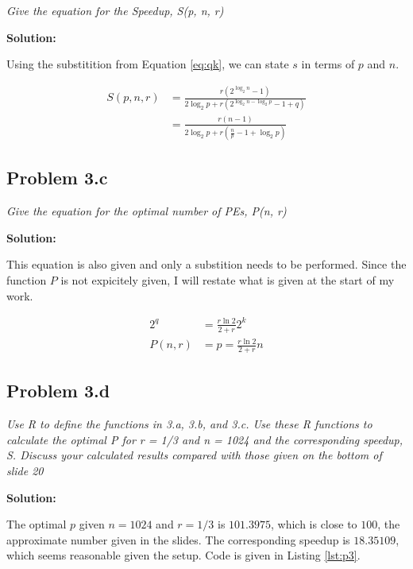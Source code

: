 \documentclass[12pt,letterpaper]{article}
\newcommand{\problem}[1]{\textit{#1} \medskip}
\newcommand{\solution}{ \noindent \textbf{Solution:} \medskip}
\begin{document}
\problem{Give the equation for the Speedup, S(p, n, r)}

\solution

Using the substitition from Equation \ref{eq:qk}, we can state $s$ in terms of $p$ and $n$.

\begin{align}
    S(p, n, r) &= \frac{r\left(2^{\log_2{n}}-1\right)}{2 \log_2{p} +
    r\left(2^{\log_2{n}-\log_2{p}}-1+q\right)}\nonumber\\
    &= \frac{r\left(n-1\right)}{2\log_2{p}+r\left(\frac{n}{p} -1 +\log_2{p}\right)}
\end{align}



\subsection*{Problem 3.c}

\problem{Give the equation for the optimal number of PEs, P(n, r)}

\solution

This equation is also given and only a substition needs to be performed. Since the function $P$ is
not expicitely given, I will restate what is given at the start of my work.

\begin{align}
    2^q &= \frac{r\ln 2}{2+r} 2^k\\
    P(n, r) &= p = \frac{r\ln 2}{2+r} n
\end{align}

\subsection*{Problem 3.d}

\problem{Use R to define the functions in 3.a, 3.b, and 3.c. Use these R functions to
calculate the optimal P for r = 1/3 and n = 1024 and the corresponding speedup, S.
Discuss your calculated results compared with those given on the bottom of slide 20}

\solution

The optimal $p$ given $n=1024$ and $r=1/3$ is $101.3975$, which is close to $100$, the approximate
number given in the slides. The corresponding speedup is $18.35109$, which seems reasonable given
the setup. Code is given in Listing \ref{lst:p3}.


\end{document}
